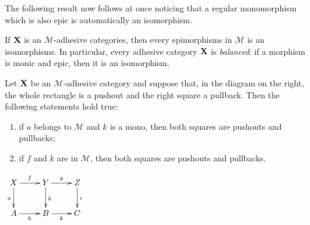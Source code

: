 \documentclass[a4paper,UKenglish,cleveref,pdftex,thm-restate,numberwithinsect,anonymous]{lipics}
\def\X{\textbf {\textup{X}}}
\begin{document}
The following result now follows at once noticing that a regular monomorphism which is also epic is automatically an isomorphism.

\begin{corollary}\label{prop:bal}
	If $\X$ is an $\mathcal{M}$-adhesive categories, then every epimorphisms in $\mathcal{M}$ is an isomorphisms. In particular, every adhesive category $\X$ is \emph{balanced}: if a morphism is monic and epic, then it is an isomorphism.
\end{corollary}

\noindent 
\parbox{10cm}{\begin{lemma}\label{lem:popb} Let $\X$ be an $\mathcal{M}$-adhesive category  and suppose that, in the diagram on the right, the whole rectangle is a pushout and the right square a pullback.	Then the following statements hold true:
\parbox{13cm}	{\begin{enumerate}
		\item if $a$ belongs to $\mathcal{M}$ and $k$ is a mono,  then both squares are pushouts and pullbacks;
		\item if $f$ and $k $ are in  $\mathcal{M}$, then both squares are pushouts and pullbacks.
	\end{enumerate}}
\end{lemma}}
\parbox{4cm}{\vspace{-1cm}
	$\xymatrix{X \ar[d]_{a} \ar[r]^{f}& \ar[r]^{g} Y \ar[d]^{b}& Z \ar[d]^{c}\\ A \ar[r]_{h}& B \ar[r]_{k}& C}$}\\
\end{document}
